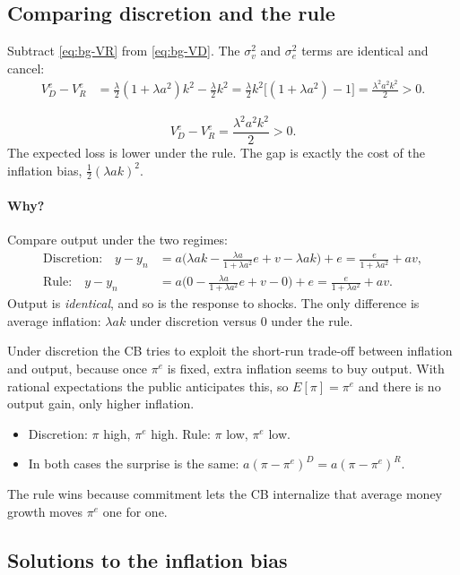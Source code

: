 \subsection{Comparing discretion and the rule }
Subtract \eqref{eq:bg-VR} from \eqref{eq:bg-VD}. The $\sigma_v^2$ and $\sigma_e^2$ terms are identical and cancel:
\begin{align*}
V_D^e-V_R^e&=\frac{\lambda}{2}(1+\lambda a^2)k^2-\frac{\lambda}{2}k^2
=\frac{\lambda}{2}k^2\big[(1+\lambda a^2)-1\big]
=\frac{\lambda^2a^2k^2}{2}>0 .
\end{align*}
\begin{keybox}[title=Rule beats discretion]
\[
V_D^e-V_R^e=\frac{\lambda^2a^2k^2}{2}>0 .
\]
The expected loss is lower under the rule. The gap is exactly the cost of the inflation bias, $\frac12(\lambda ak)^2$.
\end{keybox}

\paragraph{Why?} Compare output under the two regimes:
\begin{align*}
\text{Discretion:}\quad y-y_n&=a\Big(\lambda ak-\tfrac{\lambda a}{1+\lambda a^2}e+v-\lambda ak\Big)+e=\frac{e}{1+\lambda a^2}+av,\\
\text{Rule:}\quad y-y_n&=a\Big(0-\tfrac{\lambda a}{1+\lambda a^2}e+v-0\Big)+e=\frac{e}{1+\lambda a^2}+av .
\end{align*}
Output is \emph{identical}, and so is the response to shocks. The only difference is average inflation: $\lambda ak$ under discretion versus $0$ under the rule.
\begin{tipbox}
Under discretion the CB tries to exploit the short-run trade-off between inflation and output, because once $\pi^e$ is fixed, extra inflation seems to buy output. With rational expectations the public anticipates this, so $E[\pi]=\pi^e$ and there is no output gain, only higher inflation.
\begin{itemize}
  \item Discretion: $\pi$ high, $\pi^e$ high. Rule: $\pi$ low, $\pi^e$ low.
  \item In both cases the surprise is the same: $a(\pi-\pi^e)^D=a(\pi-\pi^e)^R$.
\end{itemize}
The rule wins because commitment lets the CB internalize that average money growth moves $\pi^e$ one for one.
\end{tipbox}

\subsection{Solutions to the inflation bias }

